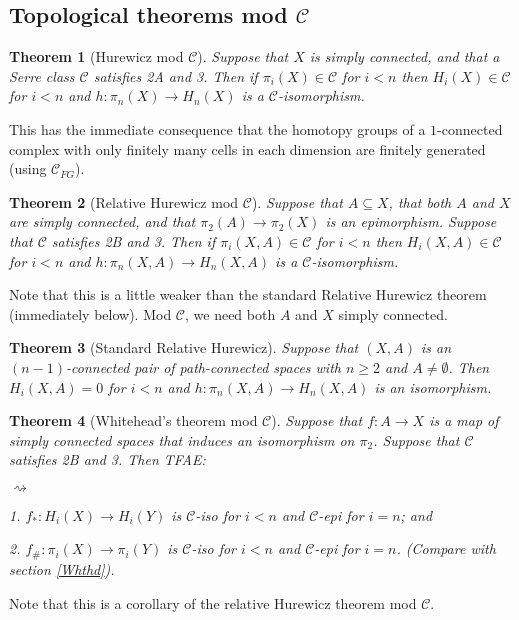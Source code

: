 \documentclass[11pt]{article}
\theoremstyle{plain}
\newtheorem*{thm*}{Theorem}
\theoremstyle{definition}
\renewcommand{\to}{\longrightarrow}
\newcommand{\SerreClass}{\mathscr{C}}
\newenvironment{itemise}{
\begin{list}{\textup{$\rightsquigarrow$}}
   {
      \setlength{\topsep}{.1cm}
      \setlength{\itemsep}{1pt}
      \setlength{\parskip}{0pt}
      \setlength{\parsep}{0pt}
   }
}{\end{list}\vspace{-.2cm}}
\begin{document}
\subsection{Topological theorems mod \texorpdfstring{$\SerreClass$}{C}}
\begin{thm*}[Hurewicz mod $\SerreClass$]
Suppose that $X$ is simply connected, and that a Serre class $\SerreClass$ satisfies \textup{2A} and \textup{3}. Then if $\pi_i(X)\in\SerreClass$ for $i<n$ then $H_i(X)\in\SerreClass$ for $i<n$ and $h:\pi_n(X)\to H_n(X)$ is a $\SerreClass$-isomorphism.
\end{thm*}
This has the immediate consequence that the homotopy groups of a $1$-connected complex with only finitely many cells in each dimension are finitely generated (using $\SerreClass_{FG}$).
\begin{thm*}[Relative Hurewicz mod $\SerreClass$]
Suppose that $A\subseteq X$, that both $A$ and $X$ are simply connected, and that $\pi_2(A)\to\pi_2(X)$ is an epimorphism. Suppose that $\SerreClass$ satisfies \textup{2B} and \textup{3}. Then if $\pi_i(X,A)\in\SerreClass$ for $i<n$ then $H_i(X,A)\in\SerreClass$ for $i<n$ and $h:\pi_n(X,A)\to H_n(X,A)$ is a $\SerreClass$-isomorphism.
\end{thm*}
Note that this is a little weaker than the standard Relative Hurewicz theorem (immediately below). Mod $\SerreClass$, we need both $A$ and $X$ simply connected.
\begin{thm*}[Standard Relative Hurewicz]
Suppose that $(X,A)$ is an $(n-1)$-connected pair of path-connected spaces with $n\geq2$ and $A\neq\emptyset$. Then $H_i(X,A)=0$ for $i<n$ and $h:\pi_n(X,A)\to H_n(X,A)$ is an isomorphism.
\end{thm*}
\begin{thm*}[Whitehead's theorem mod $\SerreClass$]\label{WhthdModC}
Suppose that $f:A\to X$ is a map of simply connected spaces that induces an isomorphism on $\pi_2$. Suppose that $\SerreClass$ satisfies \textup{2B} and \textup{3}. Then TFAE:
\begin{itemise}
\item[1.] $f_*:H_i(X)\to H_i(Y)$ is $\SerreClass$-iso for $i<n$ and $\SerreClass$-epi for $i=n$; and
\item[2.] $f_\#:\pi_i(X)\to \pi_i(Y)$ is $\SerreClass$-iso for $i<n$ and $\SerreClass$-epi for $i=n$. \hfill (Compare with section \ref{Whthd}).
\end{itemise}
\end{thm*}
Note that this is a corollary of the relative Hurewicz theorem mod $\SerreClass$.
\end{document}
